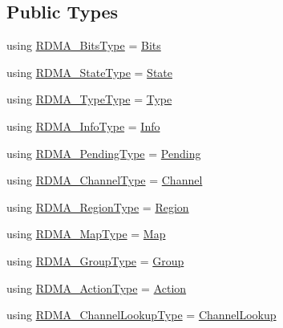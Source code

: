 \subsection*{Public Types}
\begin{DoxyCompactItemize}
\item 
using \hyperlink{structvt_1_1rdma_1_1_r_d_m_a_manager_a1fd134fc514587ac616aec8530c7cc87}{R\+D\+M\+A\+\_\+\+Bits\+Type} = \hyperlink{namespacevt_1_1rdma_a91e7211515508952960ca446ea609f65}{Bits}
\item 
using \hyperlink{structvt_1_1rdma_1_1_r_d_m_a_manager_aad42879902ea82c4de357ad482d9333d}{R\+D\+M\+A\+\_\+\+State\+Type} = \hyperlink{structvt_1_1rdma_1_1_state}{State}
\item 
using \hyperlink{structvt_1_1rdma_1_1_r_d_m_a_manager_a7f4369a60dfe2ca11abe39a4ce8c2f5e}{R\+D\+M\+A\+\_\+\+Type\+Type} = \hyperlink{namespacevt_1_1rdma_ac848e1d9da43db6294bd06f83e5d3946}{Type}
\item 
using \hyperlink{structvt_1_1rdma_1_1_r_d_m_a_manager_a81658757dd2c692d5c31048d2d53cb3d}{R\+D\+M\+A\+\_\+\+Info\+Type} = \hyperlink{structvt_1_1rdma_1_1_info}{Info}
\item 
using \hyperlink{structvt_1_1rdma_1_1_r_d_m_a_manager_a1239149a2070897c56e94e65c2016a7a}{R\+D\+M\+A\+\_\+\+Pending\+Type} = \hyperlink{structvt_1_1rdma_1_1_pending}{Pending}
\item 
using \hyperlink{structvt_1_1rdma_1_1_r_d_m_a_manager_ad6a7e417dca07fe5743318e1153677a8}{R\+D\+M\+A\+\_\+\+Channel\+Type} = \hyperlink{structvt_1_1rdma_1_1_channel}{Channel}
\item 
using \hyperlink{structvt_1_1rdma_1_1_r_d_m_a_manager_aafc574f533ebf5b34c1389ef504448bf}{R\+D\+M\+A\+\_\+\+Region\+Type} = \hyperlink{structvt_1_1rdma_1_1_region}{Region}
\item 
using \hyperlink{structvt_1_1rdma_1_1_r_d_m_a_manager_a16e12d11cf7d771df0d3dc6947a4f95c}{R\+D\+M\+A\+\_\+\+Map\+Type} = \hyperlink{structvt_1_1rdma_1_1_map}{Map}
\item 
using \hyperlink{structvt_1_1rdma_1_1_r_d_m_a_manager_a578dd586d6982be7476b4df7656cd024}{R\+D\+M\+A\+\_\+\+Group\+Type} = \hyperlink{structvt_1_1rdma_1_1_group}{Group}
\item 
using \hyperlink{structvt_1_1rdma_1_1_r_d_m_a_manager_a7b857edc3e489efd9e65e160a4e55a68}{R\+D\+M\+A\+\_\+\+Action\+Type} = \hyperlink{structvt_1_1rdma_1_1_action}{Action}
\item 
using \hyperlink{structvt_1_1rdma_1_1_r_d_m_a_manager_a3df5b264f344d9d4530a96264782a725}{R\+D\+M\+A\+\_\+\+Channel\+Lookup\+Type} = \hyperlink{structvt_1_1rdma_1_1_channel_lookup}{Channel\+Lookup}

\end{DoxyCompactItemize}
